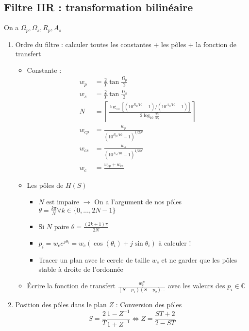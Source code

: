 \documentclass[9pt]{article}
\begin{document}
\begin{multicols}{3}
\subsection{Filtre IIR : transformation bilinéaire}
On a $ \Omega _p, \Omega _s, R_p, A_s $ 
\begin{enumerate}
    \item Ordre du filtre : calculer toutes les constantes + les pôles + la fonction de transfert 
        \begin{itemize}
            \item Constante :
                \begin{align*}
                    w_p &= \frac{2}{T} \tan \frac{\Omega_p }{2} \\
                    w_s &= \frac{2}{T} \tan \frac{\Omega_s }{2} \\
                    N &= \left\lceil \frac{\log_{10} [(10^{R_p/10} - 1)/(10^{A_s/10} - 1)]}{2 \log_{10} \frac{w_p}{w_s}}\right\rceil \\
                    w_{cp} &= \frac{w_p}{(10^{R_p/10} - 1)^{1/2N}} \\
                    w_{cs} &= \frac{w_s}{(10^{A_s/10} - 1)^{1/2N}} \\
                    w_c &= \frac{w_{cp} + w_{cs}}{}
                \end{align*}
            \item Les pôles de $ H(S) $ 
                \begin{itemize}
                    \item $ N $ est impaire $\rightarrow$ On a l'argument de nos pôles $ \theta = \frac{k \pi }{N} \forall k \in \{0, \dots, 2N-1\} $ 
                    \item Si $ N $ paire $ \theta = \frac{(2k+1)\pi }{2N} $ 
                    \item $ p_i = w_c e^{j \theta_i } = w_c (\cos (\theta _i) + j \sin \theta _i)$ à calculer ! 
                    \item Tracer un plan avec le cercle de taille $ w_c $  et ne garder que les pôles stable à droite de l'ordonnée 
                \end{itemize}
            \item Écrire la fonction de transfert $ \frac{w_c^N}{(S-p_1)(S-p_2)\dots} $ avec les valeurs des $ p_i \in \mathbb{C}$ 
        \end{itemize}
    \item Position des pôles dans le plan $ Z $ : Conversion des pôles 
    \[
        S = \frac{2}{T} \frac{1 - Z^{-1}}{1 + Z^{-1}} \Leftrightarrow Z = \frac{ST + 2}{2 - ST}
\]
\end{enumerate}
\end{multicols}
\end{document}
